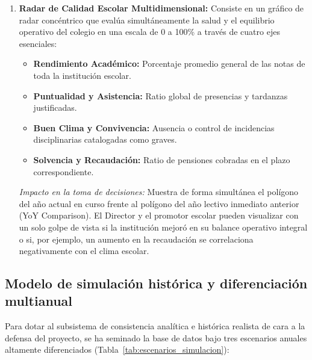 \documentclass[12pt,a4paper,oneside]{report}
\begin{document}
\begin{enumerate}
    \item \textbf{Radar de Calidad Escolar Multidimensional:}
    Consiste en un gráfico de radar concéntrico que evalúa simultáneamente la salud y el equilibrio operativo del colegio en una escala de 0 a 100\% a través de cuatro ejes esenciales:
    \begin{itemize}
        \item \textbf{Rendimiento Académico:} Porcentaje promedio general de las notas de toda la institución escolar.
        \item \textbf{Puntualidad y Asistencia:} Ratio global de presencias y tardanzas justificadas.
        \item \textbf{Buen Clima y Convivencia:} Ausencia o control de incidencias disciplinarias catalogadas como graves.
        \item \textbf{Solvencia y Recaudación:} Ratio de pensiones cobradas en el plazo correspondiente.
    \end{itemize}
    \textit{Impacto en la toma de decisiones:} Muestra de forma simultánea el polígono del año actual en curso frente al polígono del año lectivo inmediato anterior (YoY Comparison). El Director y el promotor escolar pueden visualizar con un solo golpe de vista si la institución mejoró en su balance operativo integral o si, por ejemplo, un aumento en la recaudación se correlaciona negativamente con el clima escolar.
\end{enumerate}

\subsection{Modelo de simulación histórica y diferenciación multianual}
Para dotar al subsistema de consistencia analítica e histórica realista de cara a la defensa del proyecto, se ha seminado la base de datos bajo tres escenarios anuales altamente diferenciados (Tabla~\ref{tab:escenarios_simulacion}):
\end{document}
